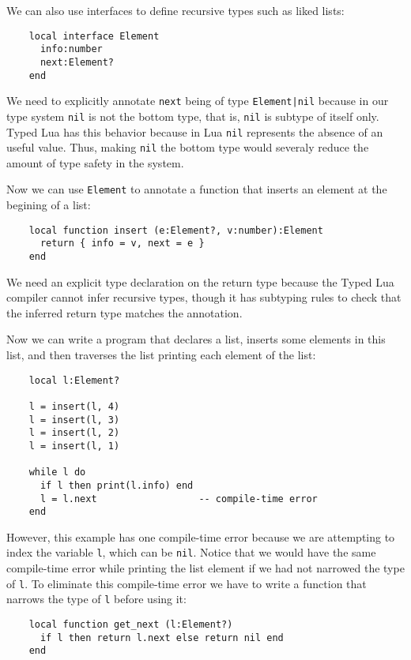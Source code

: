 We can also use interfaces to define recursive types such as liked lists:

\begin{verbatim}
    local interface Element
      info:number
      next:Element?
    end
\end{verbatim}

We need to explicitly annotate \texttt{next} being of type
\texttt{Element|nil} because in our type system \texttt{nil}
is not the bottom type, that is, \texttt{nil} is subtype of itself only.
Typed Lua has this behavior because in Lua \texttt{nil} represents
the absence of an useful value.
Thus, making \texttt{nil} the bottom type would severaly reduce the amount
of type safety in the system.

Now we can use \texttt{Element} to annotate a function that
inserts an element at the begining of a list:
\begin{verbatim}
    local function insert (e:Element?, v:number):Element 
      return { info = v, next = e }
    end
\end{verbatim}

We need an explicit type declaration on the return type because
the Typed Lua compiler cannot infer recursive types, though
it has subtyping rules to check that the inferred return type
matches the annotation.

Now we can write a program that declares a list, inserts some
elements in this list, and then traverses the list printing
each element of the list:
\begin{verbatim}
    local l:Element?

    l = insert(l, 4)
    l = insert(l, 3)
    l = insert(l, 2)
    l = insert(l, 1)

    while l do
      if l then print(l.info) end
      l = l.next                  -- compile-time error
    end
\end{verbatim}

However, this example has one compile-time error because we
are attempting to index the variable \texttt{l},
which can be \texttt{nil}.
Notice that we would have the same compile-time error while
printing the list element if we had not narrowed the type of
\texttt{l}.
To eliminate this compile-time error we have to write a
function that narrows the type of \texttt{l} before using it:
\begin{verbatim}
    local function get_next (l:Element?)
      if l then return l.next else return nil end
    end
\end{verbatim}


